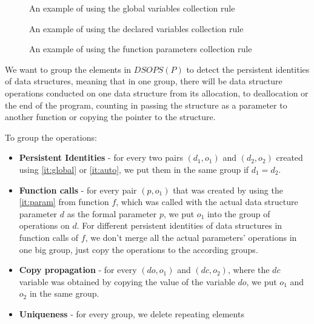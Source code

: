 \documentclass[a4paper,11pt]{article}
\begin{document}
        \begin{figure}[h]
            

            \caption{An example of using the global variables collection rule}

            \label{fig:global-collection-rule}
        \end{figure}
        \begin{figure}[h]
            
            \caption{An example of using the declared variables collection rule}

            \label{fig:declared-collection-rule}
        \end{figure}
        \begin{figure}[h]
            

            \caption{An example of using the function parameters collection rule}

            \label{fig:parameter-collection-rule}
        \end{figure}

        \clearpage


		We want to group the elements in $DSOPS(P)$ to detect the persistent identities \cite{Okasaki} of
		data structures, meaning that in one group, there will be data structure operations conducted on one
		data structure from its allocation, to deallocation or the end of the program, counting in passing the structure as a
		parameter to another function or copying the pointer to the structure.

		To group the operations:
		\begin{itemize}

            \item \textbf{Persistent Identities} - for every two pairs $(d_1, o_1)$ and $(d_2, o_2)$ created using
                \autoref{it:global} or \autoref{it:auto}, we put them in the same group if $d_1 = d_2$.

            \item \textbf{Function calls} - for every pair $(p, o_1)$ that was created by using the \autoref{it:param}
                from function $f$, which was called with the actual data structure parameter $d$ as the formal parameter
                $p$, we put $o_1$ into the group of operations on $d$. For different persistent identities of data
                structures in function calls of $f$, we don't merge all the actual parameters' operations in one big
                group, just copy the operations to the according groups.

            \item \textbf{Copy propagation} - for every $(do, o_1)$ and $(dc, o_2)$, where the $dc$ variable was
                obtained by copying the value of the variable $do$, we put $o_1$ and $o_2$ in the same group.

            \item \textbf{Uniqueness} - for every group, we delete repeating elements

		\end{itemize}
\end{document}
